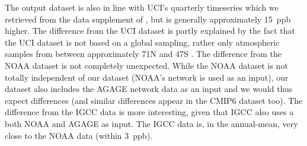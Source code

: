 The output dataset is also in line with UCI's quarterly timeseries \citep{simpson_ethane_2012}
which we retrieved from the data supplement of \citet{saunois_methane-budget_2025},
but is generally approximately 15~ppb higher.
The difference from the UCI dataset is partly explained by the fact that the UCI dataset is not based on a global sampling,
rather only atmospheric samples from between approximately 71\textdegree N and 47\textdegree S \citep{blake_uci-network-readme_2010}.
The difference from the NOAA dataset is not completely unexpected.
While the NOAA dataset is not totally independent of our dataset (NOAA's network is used as an input),
our dataset also includes the AGAGE \citep{prinn_ale-gage-agage_2000,prinn_agage_2018} network data as an input
and we would thus expect differences (and similar differences appear in the CMIP6 dataset too).
The difference from the IGCC data is more interesting, given that IGCC also uses a both NOAA and AGAGE as input.
The IGCC data is, in the annual-mean, very close to the NOAA data (within 3~ppb).
